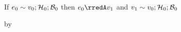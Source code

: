 \begin{lemma}\label{AT-T-value}
  If\/ $e_0 \sim v_0; \mathcal{H}_0; \mathcal{B}_0$
  then\/ $\sexpr_0 \rredA \svalue_1$
  and\/ $v_1 \sim v_0; \mathcal{H}_0; \mathcal{B}_0$
\end{lemma}
\begin{lamportproof}

    \begin{pfproof}
      \qedstep
    \end{pfproof}

    \begin{pfproof}
      \qedstep
        \begin{pfproof}
          by 
        \end{pfproof}
    \end{pfproof}
\end{lamportproof}

